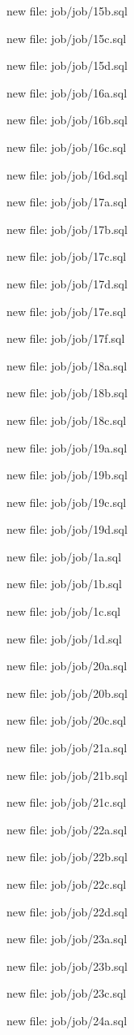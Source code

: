 \documentclass[11pt,a4paper]{article}
\begin{document}
{new file:   job/job/15b.sql

new file:   job/job/15c.sql

new file:   job/job/15d.sql

new file:   job/job/16a.sql

new file:   job/job/16b.sql

new file:   job/job/16c.sql

new file:   job/job/16d.sql

new file:   job/job/17a.sql

new file:   job/job/17b.sql

new file:   job/job/17c.sql

new file:   job/job/17d.sql

new file:   job/job/17e.sql

new file:   job/job/17f.sql

new file:   job/job/18a.sql

new file:   job/job/18b.sql

new file:   job/job/18c.sql

new file:   job/job/19a.sql

new file:   job/job/19b.sql

new file:   job/job/19c.sql

new file:   job/job/19d.sql

new file:   job/job/1a.sql

new file:   job/job/1b.sql

new file:   job/job/1c.sql

new file:   job/job/1d.sql

new file:   job/job/20a.sql

new file:   job/job/20b.sql

new file:   job/job/20c.sql

new file:   job/job/21a.sql

new file:   job/job/21b.sql

new file:   job/job/21c.sql

new file:   job/job/22a.sql

new file:   job/job/22b.sql

new file:   job/job/22c.sql

new file:   job/job/22d.sql

new file:   job/job/23a.sql

new file:   job/job/23b.sql

new file:   job/job/23c.sql

new file:   job/job/24a.sql

}
\end{document}
